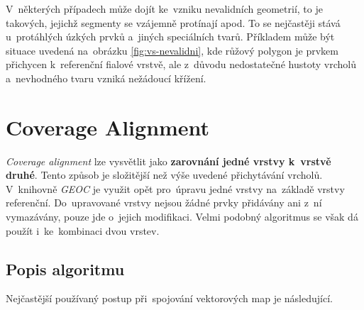 V~některých případech může dojít ke~vzniku nevalidních geometrií, to je takových,
jejichž segmenty se vzájemně protínají apod. To se nejčastěji stává u~protáhlých 
úzkých prvků a~jiných speciálních tvarů. Příkladem může být situace uvedená 
na~obrázku \ref{fig:vs-nevalidni}, kde růžový polygon je prvkem přichycen 
k~referenční fialové vrstvě, ale z~důvodu nedostatečné hustoty vrcholů a~nevhodného
tvaru vzniká nežádoucí křížení. 




\section{Coverage Alignment} 
\label{coverage alignment}

\textit{Coverage alignment} lze vysvětlit jako \textbf{zarovnání jedné vrstvy 
k~vrstvě druhé}. Tento způsob je složitější než výše uvedené přichytávání vrcholů.
V~knihovně \textit{GEOC} je využit opět pro~úpravu jedné vrstvy na~základě vrstvy 
referenční. Do~upravované vrstvy nejsou žádné prvky přidávány ani z~ní vymazávány,
pouze jde o~jejich modifikaci. Velmi podobný algoritmus se však dá použít 
i~ke~kombinaci dvou vrstev. 

\subsection{Popis algoritmu}
\label{ca-algoritmus}

Nejčastější používaný postup při~spojování vektorových map je následující.

